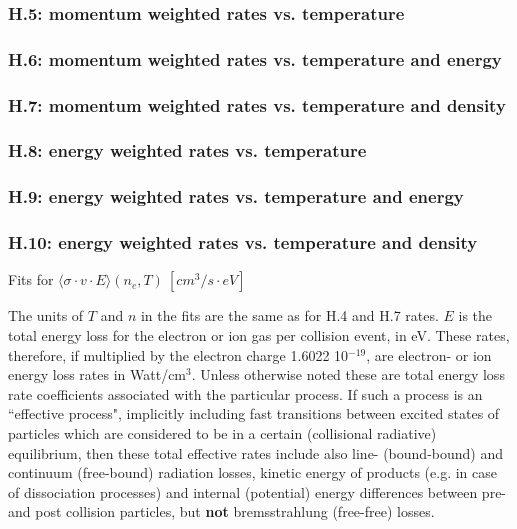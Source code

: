 \documentclass[12pt,dvips]{article}
\begin{document}
\subsubsection*{H.5: momentum weighted rates vs. temperature}
\subsubsection*{H.6: momentum weighted rates vs. temperature and energy}
\subsubsection*{H.7: momentum weighted rates vs. temperature and density}
\subsubsection*{H.8: energy weighted rates vs. temperature}
\subsubsection*{H.9: energy weighted rates vs. temperature and energy}
\subsubsection*{H.10: energy weighted rates vs. temperature and density}
Fits for $\langle\sigma \cdot v \cdot E \rangle (n_e,T) \ [cm^3/s \cdot eV]$

The units of $T$ and $n$ in the fits are the same as for H.4 and H.7
rates. $E$ is the total energy loss for the electron or ion gas per
collision event, in eV. These rates, therefore, if multiplied by the
electron charge 1.6022 10$^{-19}$, are electron- or ion energy loss
rates in Watt/cm$^3$. Unless otherwise noted these are total energy
loss rate coefficients associated with the particular process. If
such a process is an ``effective process", implicitly including fast
transitions between excited states of particles which are considered
to be in a certain (collisional radiative) equilibrium, then these
total effective rates include also line- (bound-bound) and continuum
(free-bound) radiation losses, kinetic energy of products (e.g. in
case of dissociation processes) and internal (potential) energy
differences between pre- and post collision particles, but {\bf not}
bremsstrahlung (free-free) losses.
\end{document}
